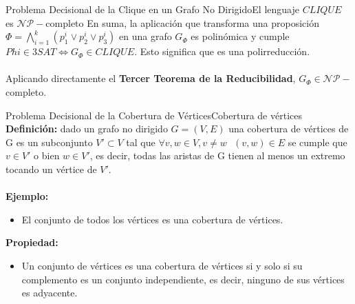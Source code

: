 \documentclass[10pt, envcountsect, presentation, aspectratio=169]{beamer}
\begin{document}
\begin{frame}{Problema Decisional de la Clique en un Grafo No Dirigido}{El lenguaje $CLIQUE$ es $\mathcal{NP}-$completo}
    En suma, la aplicación que transforma una proposición $\Phi=\bigwedge_{i=1}^k(p_1^i \vee p_2^i \vee p_3^i)$ en una grafo $G_\Phi$ es polinómica y cumple $Phi \in 3SAT \Leftrightarrow G_\Phi \in CLIQUE$. Esto significa que es una polirreducción. \\~\\ 

    Aplicando directamente el \textbf{Tercer Teorema de la Reducibilidad}, $G_\Phi \in \mathcal{NP}-$completo. $\boxed{ }$
\end{frame}



\begin{frame}{Problema Decisional de la Cobertura de Vértices}{Cobertura de vértices}
    \textbf{Definición:} dado un grafo no dirigido $G=(V,E)$ una cobertura de vértices de G es un subconjunto  $V' \subset V$ tal que $\forall v, w \in V, v \neq w \text{ } (v,w)\in E$ se cumple que $v \in V'$ o bien $w\in V'$, es decir, todas las aristas de G tienen al menos un extremo tocando un vértice de $V'$.
     \\~\\

    \textbf{Ejemplo:}

    \begin{itemize}
        \item[] El conjunto de todos los vértices es una cobertura de vértices.
    \end{itemize}

    \textbf{Propiedad:}

    \begin{itemize}
        \item[] Un conjunto de vértices es una cobertura de vértices si y solo si su complemento es un conjunto independiente, es decir, ninguno de sus vértices es adyacente.
    \end{itemize}
    
\end{frame}


\end{document}
